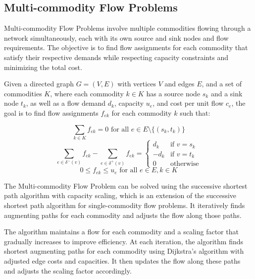 \documentclass[12pt]{book} %
\begin{document}
\subsection{Multi-commodity Flow Problems}

Multi-commodity Flow Problems involve multiple commodities flowing through a network simultaneously, each with its own source and sink nodes and flow requirements. The objective is to find flow assignments for each commodity that satisfy their respective demands while respecting capacity constraints and minimizing the total cost.

Given a directed graph \(G = (V, E)\) with vertices \(V\) and edges \(E\), and a set of commodities \(K\), where each commodity \(k \in K\) has a source node \(s_k\) and a sink node \(t_k\), as well as a flow demand \(d_k\), capacity \(u_e\), and cost per unit flow \(c_e\), the goal is to find flow assignments \(f_{ek}\) for each commodity \(k\) such that:

\[
\sum_{k \in K} f_{ek} = 0 \text{ for all } e \in E \setminus \{(s_k, t_k)\}
\]
\[
\sum_{e \in \delta^-(v)} f_{ek} - \sum_{e \in \delta^+(v)} f_{ek} = 
\begin{cases} 
d_k & \text{if } v = s_k \\
-d_k & \text{if } v = t_k \\
0 & \text{otherwise}
\end{cases}
\]
\[
0 \leq f_{ek} \leq u_e \text{ for all } e \in E, k \in K
\]

The Multi-commodity Flow Problem can be solved using the successive shortest path algorithm with capacity scaling, which is an extension of the successive shortest path algorithm for single-commodity flow problems. It iteratively finds augmenting paths for each commodity and adjusts the flow along those paths.

The algorithm maintains a flow for each commodity and a scaling factor that gradually increases to improve efficiency. At each iteration, the algorithm finds shortest augmenting paths for each commodity using Dijkstra's algorithm with adjusted edge costs and capacities. It then updates the flow along these paths and adjusts the scaling factor accordingly.
\end{document}
